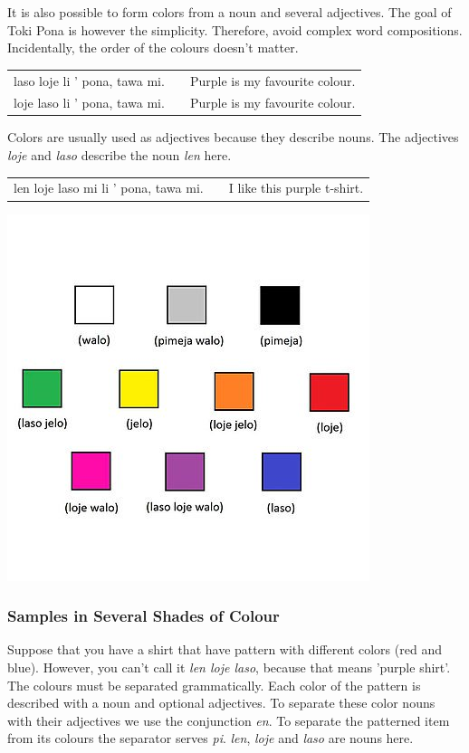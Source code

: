 It is also possible to form colors from a noun and several adjectives. 
The goal of Toki Pona is however the simplicity.
Therefore, avoid complex word compositions.
Incidentally, the order of the colours doesn't matter.

\begin{supertabular}{p{5,5cm}|ll}
laso loje  li ' pona, tawa mi. && Purple is my favourite colour.  \\ %
loje laso  li ' pona, tawa mi. && Purple is my favourite colour.  \\
\end{supertabular}

Colors are usually used as adjectives because they describe nouns. 
The adjectives \textit{loje} and \textit{laso} describe the noun \textit{len} here.

\begin{supertabular}{p{5,5cm}|ll}
len loje laso mi li ' pona, tawa mi. && I like this purple t-shirt. \\
\end{supertabular}

%
\includegraphics[scale=0.4]{colors.png}
%
\subsubsection*{Samples in Several Shades of Colour}
%
%
Suppose that you have a shirt that have pattern with different colors (red and blue). 
However, you can't call it \textit{len loje laso}, because that means 'purple shirt'. 
The colours must be separated grammatically. 
Each color of the pattern is described with a noun and optional adjectives. 
To separate these color nouns with their adjectives we use the conjunction \textit{en}.
To separate the patterned item from its colours the separator serves \textit{pi}.
\textit{len}, \textit{loje} and \textit{laso} are nouns here. 

